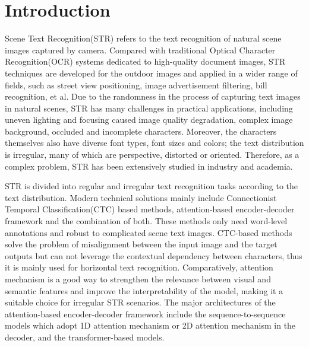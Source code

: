 \documentclass[runningheads]{llncs}
\begin{document}
\section{Introduction}
Scene Text Recognition(STR) refers to the text recognition of natural scene images captured by camera. Compared with traditional Optical Character Recognition(OCR) systems dedicated to high-quality document images, STR techniques are developed for the outdoor images and applied in a wider range of fields, such as street view positioning, image advertisement filtering, bill recognition, et al. Due to the randomness in the process of capturing text images in natural scenes, STR has many challenges in practical applications, including uneven lighting and focusing caused image quality degradation, complex image background, occluded and incomplete characters. Moreover, the characters themselves also have diverse font types, font sizes and colors; the text distribution is irregular, many of which are perspective, distorted or oriented. Therefore, as a complex problem, STR has been extensively studied in industry and academia.

STR is divided into regular and irregular text recognition tasks according to the text distribution. Modern technical solutions mainly include Connectionist Temporal Classification(CTC) based methods\cite{shi2016end}, attention-based encoder-decoder framework\cite{shi2018aster,yang2020holistic} and the combination of both\cite{litman2020scatter,zuo2019natural}. These methods only need word-level annotations and robust to complicated scene text images. CTC-based methods solve the problem of misalignment between the input image and the target outputs but can not leverage the contextual dependency between characters, thus it is mainly used for horizontal text recognition. Comparatively, attention mechanism is a good way to strengthen the relevance between visual and semantic features and improve the interpretability of the model, making it a suitable choice for irregular STR scenarios. The major architectures of the attention-based encoder-decoder framework include the sequence-to-sequence models which adopt 1D attention mechanism\cite{shi2018aster} or 2D attention mechanism\cite{li2019show} in the decoder, and the transformer-based models\cite{yang2020holistic,lu2019master,sheng2019nrtr}.
\end{document}
